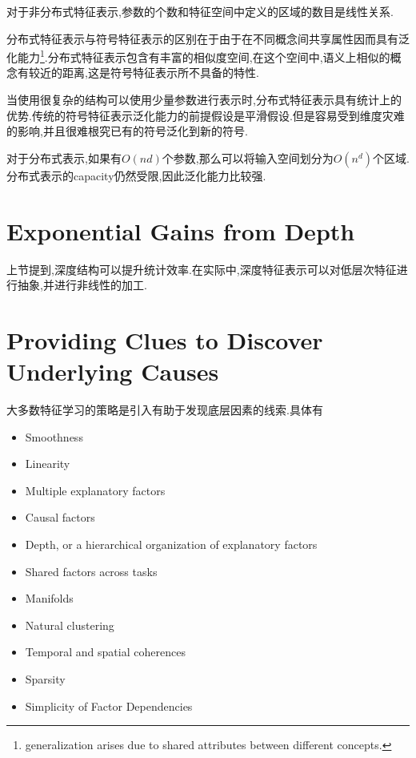 对于非分布式特征表示,参数的个数和特征空间中定义的区域的数目是线性关系.

分布式特征表示与符号特征表示的区别在于由于在不同概念间共享属性因而具有泛化能力\footnote{generalization arises due to shared attributes between different concepts.}.分布式特征表示包含有丰富的相似度空间,在这个空间中,语义上相似的概念有较近的距离,这是符号特征表示所不具备的特性.

当使用很复杂的结构可以使用少量参数进行表示时,分布式特征表示具有统计上的优势.传统的符号特征表示泛化能力的前提假设是平滑假设.但是容易受到维度灾难的影响,并且很难根究已有的符号泛化到新的符号.

对于分布式表示,如果有$O(nd)$个参数,那么可以将输入空间划分为$O(n^d)$个区域.分布式表示的capacity仍然受限,因此泛化能力比较强.

\section{Exponential Gains from Depth}

上节提到,深度结构可以提升统计效率.在实际中,深度特征表示可以对低层次特征进行抽象,并进行非线性的加工.

\section{Providing Clues to Discover Underlying Causes}

大多数特征学习的策略是引入有助于发现底层因素的线索.具体有
\begin{itemize}
    \item Smoothness
    \item Linearity
    \item Multiple explanatory factors
    \item Causal factors
    \item Depth, or a hierarchical organization of explanatory factors
    \item Shared factors across tasks
    \item Manifolds
    \item Natural clustering
    \item Temporal and spatial coherences
    \item Sparsity
    \item Simplicity of Factor Dependencies
\end{itemize}